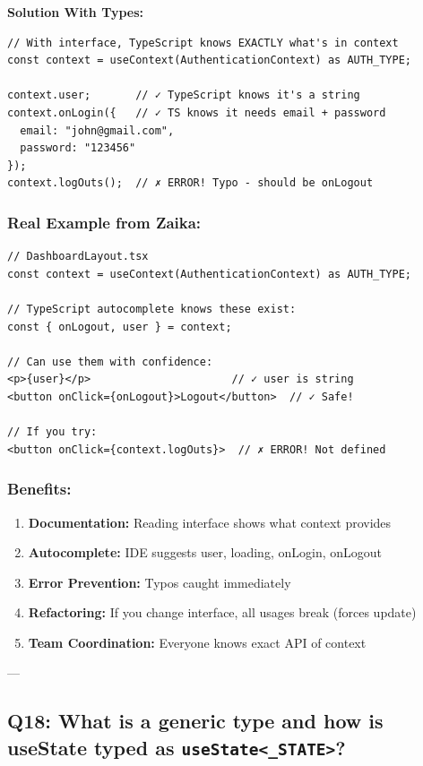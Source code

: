 \documentclass[12pt]{article}
\begin{document}
\textbf{Solution With Types:}

\begin{lstlisting}
// With interface, TypeScript knows EXACTLY what's in context
const context = useContext(AuthenticationContext) as AUTH_TYPE;

context.user;       // ✓ TypeScript knows it's a string
context.onLogin({   // ✓ TS knows it needs email + password
  email: "john@gmail.com",
  password: "123456"
});
context.logOuts();  // ✗ ERROR! Typo - should be onLogout
\end{lstlisting}

\subsubsection*{Real Example from Zaika:}

\begin{lstlisting}
// DashboardLayout.tsx
const context = useContext(AuthenticationContext) as AUTH_TYPE;

// TypeScript autocomplete knows these exist:
const { onLogout, user } = context;

// Can use them with confidence:
<p>{user}</p>                      // ✓ user is string
<button onClick={onLogout}>Logout</button>  // ✓ Safe!

// If you try:
<button onClick={context.logOuts}>  // ✗ ERROR! Not defined
\end{lstlisting}

\subsubsection*{Benefits:}

\begin{enumerate}
    \item \textbf{Documentation:} Reading interface shows what context provides
    \item \textbf{Autocomplete:} IDE suggests user, loading, onLogin, onLogout
    \item \textbf{Error Prevention:} Typos caught immediately
    \item \textbf{Refactoring:} If you change interface, all usages break (forces update)
    \item \textbf{Team Coordination:} Everyone knows exact API of context
\end{enumerate}

---

\subsection{Q18: What is a generic type and how is useState typed as \texttt{useState<\_STATE>}?}
\end{document}
